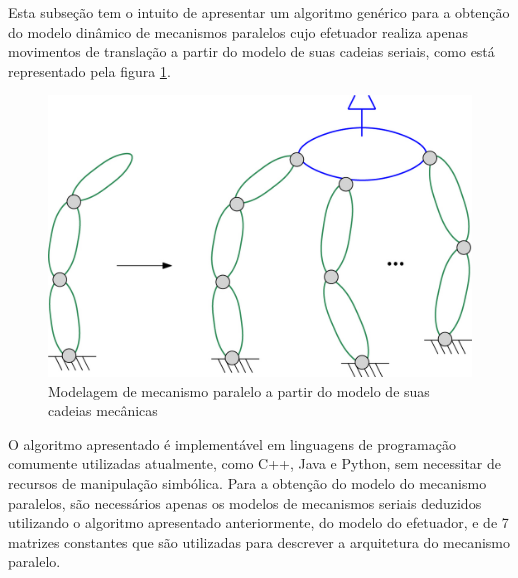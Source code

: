 \documentclass[]{politex}
\begin{document}
Esta subseção tem o intuito de apresentar um algoritmo genérico para a obtenção do modelo dinâmico de mecanismos paralelos cujo efetuador realiza apenas movimentos de translação a partir do modelo de suas cadeias seriais, como está representado pela figura \ref{fig:AcoplamentoMecParaleloFig}. 
\begin{figure}[h]
	\centering
	\includegraphics[scale=1.0]{imagens/Serial2Paralelo.jpg}  
	\caption{Modelagem de mecanismo paralelo a partir do modelo de suas cadeias mecânicas}
	\label{fig:AcoplamentoMecParaleloFig}
\end{figure}

O algoritmo apresentado é implementável em linguagens de programação comumente utilizadas atualmente, como C++, Java e Python, sem necessitar de recursos de manipulação simbólica. Para a obtenção do modelo do mecanismo paralelos, são necessários apenas os modelos de mecanismos seriais deduzidos  utilizando o algoritmo apresentado anteriormente, do modelo do efetuador, e de 7 matrizes constantes que são utilizadas para descrever a arquitetura do mecanismo paralelo. 
\end{document}
